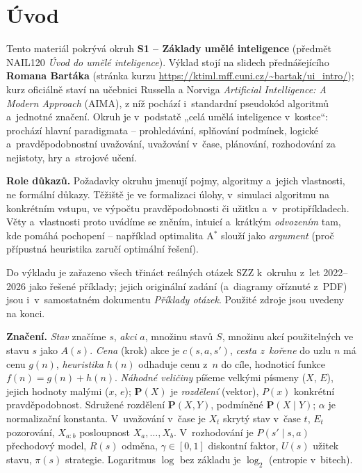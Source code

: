 \documentclass[11pt,a4paper]{article}
\begin{document}
\maketitle
\tableofcontents
\bigskip

\section*{Úvod}

Tento materiál pokrývá okruh \textbf{S1 -- Základy umělé inteligence} (předmět NAIL120 \emph{Úvod do umělé inteligence}). Výklad stojí na slidech přednášejícího \textbf{Romana Bartáka} (stránka kurzu \url{https://ktiml.mff.cuni.cz/~bartak/ui_intro/}); kurz oficiálně staví na učebnici Russella a Norviga \emph{Artificial Intelligence: A Modern Approach} (AIMA), z níž pochází i~standardní pseudokód algoritmů a~jednotné značení. Okruh je v~podstatě „celá umělá inteligence v~kostce``: prochází hlavní paradigmata -- prohledávání, splňování podmínek, logické a~pravděpodobnostní uvažování, uvažování v~čase, plánování, rozhodování za nejistoty, hry a~strojové učení.

\medskip
\noindent\textbf{Role důkazů.} Požadavky okruhu jmenují pojmy, algoritmy a~jejich vlastnosti, ne formální důkazy. Těžiště je ve formalizaci úlohy, v~simulaci algoritmu na konkrétním vstupu, ve výpočtu pravděpodobnosti či užitku a~v~protipříkladech. Věty a~vlastnosti proto uvádíme se zněním, intuicí a~krátkým \emph{odvozením} tam, kde pomáhá pochopení -- například optimalita A${}^\ast$ slouží jako \emph{argument} (proč přípustná heuristika zaručí optimální řešení).

Do výkladu je zařazeno všech třináct reálných otázek SZZ k~okruhu z~let 2022--2026 jako řešené příklady; jejich originální zadání (a~diagramy oříznuté z~PDF) jsou i~v~samostatném dokumentu \emph{Příklady otázek}. Použité zdroje jsou uvedeny na konci.

\medskip
\noindent\textbf{Značení.} \emph{Stav} značíme $s$, \emph{akci} $a$, množinu stavů $S$, množinu akcí použitelných ve stavu $s$ jako $A(s)$. \emph{Cena} (krok) akce je $c(s,a,s')$, \emph{cesta z~kořene} do uzlu $n$ má cenu $g(n)$, \emph{heuristika} $h(n)$ odhaduje cenu z~$n$ do cíle, hodnoticí funkce $f(n)=g(n)+h(n)$. \emph{Náhodné veličiny} píšeme velkými písmeny ($X$, $E$), jejich hodnoty malými ($x$, $e$); $\mathbf{P}(X)$ je \emph{rozdělení} (vektor), $P(x)$ konkrétní pravděpodobnost. Sdružené rozdělení $\mathbf{P}(X,Y)$, podmíněné $\mathbf{P}(X\mid Y)$; $\alpha$ je normalizační konstanta. V~uvažování v~čase je $X_t$ skrytý stav v~čase $t$, $E_t$ pozorování, $X_{a:b}$ posloupnost $X_a,\dots,X_b$. V~rozhodování je $P(s'\mid s,a)$ přechodový model, $R(s)$ odměna, $\gamma\in[0,1]$ diskontní faktor, $U(s)$ užitek stavu, $\pi(s)$ strategie. Logaritmus $\log$ bez základu je $\log_2$ (entropie v~bitech).
\end{document}
